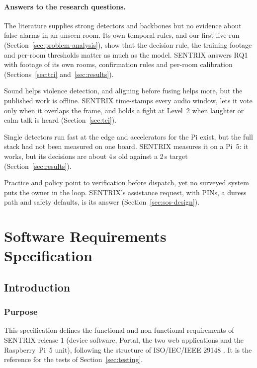 \paragraph{Answers to the research questions.}
\begin{description}[leftmargin=0pt,labelsep=0.5em]
\item[RQ1.] The literature supplies strong detectors and backbones but no evidence about false alarms in an unseen room. Its own temporal rules, and our first live run (Section~\ref{sec:problem-analysis}), show that the decision rule, the training footage and per-room thresholds matter as much as the model. SENTRIX answers RQ1 with footage of its own rooms, confirmation rules and per-room calibration (Sections~\ref{sec:tci} and~\ref{sec:results}).
\item[RQ2.] Sound helps violence detection, and aligning before fusing helps more, but the published work is offline. SENTRIX time-stamps every audio window, lets it vote only when it overlaps the frame, and holds a fight at Level~2 when laughter or calm talk is heard (Section~\ref{sec:tci}).
\item[RQ3.] Single detectors run fast at the edge and accelerators for the Pi exist, but the full stack had not been measured on one board. SENTRIX measures it on a Pi~5: it works, but its decisions are about 4\,s old against a 2\,s target (Section~\ref{sec:results}).
\item[RQ4.] Practice and policy point to verification before dispatch, yet no surveyed system puts the owner in the loop. SENTRIX's assistance request, with PINs, a duress path and safety defaults, is its answer (Section~\ref{sec:sos-design}).
\end{description}

\section{Software Requirements Specification}
\label{sec:srs}

\subsection{Introduction}
\subsubsection{Purpose}
This specification defines the functional and non-functional requirements of SENTRIX release 1 (device software, Portal, the two web applications and the Raspberry~Pi~5 unit), following the structure of ISO/IEC/IEEE 29148 \cite{iso29148}. It is the reference for the tests of Section~\ref{sec:testing}.

